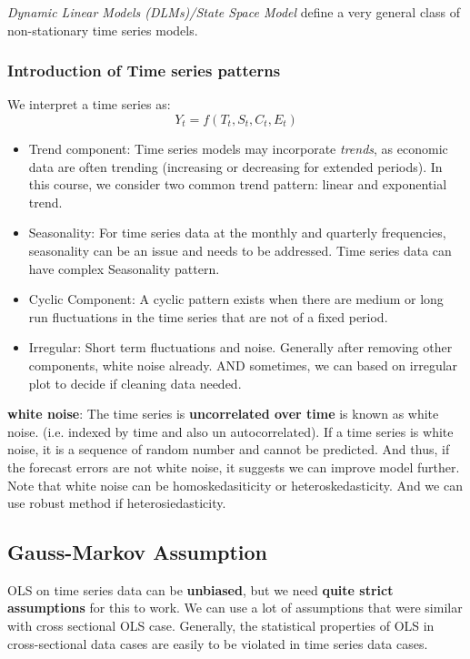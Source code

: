\documentclass[12pt]{article}
\begin{document}
\textit{Dynamic Linear Models (DLMs)/State Space Model} define a very general class of non-stationary time series models. 
\\

{\color{RoyalBlue}
\subsubsection{Introduction of Time series patterns}}
We interpret a time series as:
$$Y_t =f(T_t,S_t,C_t,E_t)$$
\begin{itemize}
\item Trend component:
Time series models may incorporate \textit{trends}, as economic data are often trending (increasing or decreasing for extended periods). In this course, we consider two common trend pattern: linear and exponential trend.
\item Seasonality:
For time series data at the monthly and quarterly frequencies, seasonality can be an issue and needs to be addressed. Time series data can have complex Seasonality pattern.
\item Cyclic Component:
A cyclic pattern exists when there are medium or long run fluctuations in the time series that are not of a fixed period.
\item Irregular: 
Short term fluctuations and noise. Generally after removing other components, white noise already. AND sometimes, we can based on irregular plot to decide if cleaning data needed.
\end{itemize}

\textbf{white noise}: The time series is \textbf{uncorrelated over time} is known as white noise. (i.e. indexed by time and also un autocorrelated). If a time series is white noise, it is a sequence of random number and cannot be predicted. And thus, if the forecast errors are not white noise, it suggests we can improve model further. Note that white noise can be homoskedasiticity or heteroskedasticity. And we can use robust method if heterosiedasticity. 

{\color{RoyalBlue}
\subsection{Gauss-Markov Assumption}}

OLS on time series data can be \textbf{unbiased}, but we need \textbf{quite strict assumptions} for this to work. We can use a lot of assumptions that were similar with cross sectional OLS case. Generally, the statistical properties of OLS in cross-sectional data cases are easily to be violated in time series data cases.
\\
\end{document}
